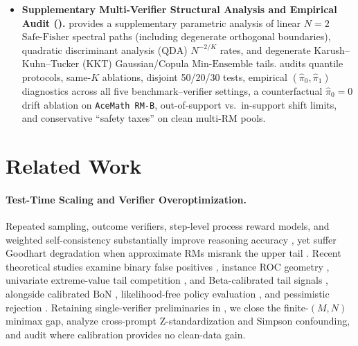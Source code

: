 \documentclass[10pt]{article}
\theoremstyle{plain}
\theoremstyle{definition}
\theoremstyle{remark}
\begin{document}
\begin{itemize}[leftmargin=1.4em,itemsep=1pt,topsep=1pt]
    \item \textbf{Supplementary Multi-Verifier Structural Analysis and Empirical Audit ().}  provides a supplementary parametric analysis of linear $N=2$ $\mathrm{Safe\text{-}Fisher}$ spectral paths (including degenerate orthogonal boundaries), quadratic discriminant analysis ($\mathrm{QDA}$) $N^{-2/K}$ rates, and degenerate Karush--Kuhn--Tucker ($\mathrm{KKT}$) Gaussian/Copula $\mathrm{Min\text{-}Ensemble}$ tails.  audits quantile protocols, same-$K$ ablations, disjoint 50/20/30 tests, empirical $(\hat{\pi}_0, \hat{\pi}_1)$ diagnostics across all five benchmark--verifier settings, a counterfactual $\hat{\pi}_0 = 0$ drift ablation on \texttt{AceMath RM-B}, out-of-support vs.\ in-support shift limits, and conservative ``safety taxes'' on clean multi-RM pools.
\end{itemize}

\section{Related Work}
\label{sec:related}

\paragraph{Test-Time Scaling and Verifier Overoptimization.}
Repeated sampling, outcome verifiers, step-level process reward models, and weighted self-consistency substantially improve reasoning accuracy \citep{cobbe2021training,wang2023selfconsistency,lightman2024lets,brown2024large,snell2024scaling,wu2024inference}, yet suffer Goodhart degradation when approximate RMs misrank the upper tail \citep{gao2023scaling,beirami2025theoretical}. Recent theoretical studies examine binary false positives \citep{stroebl2024inference}, instance ROC geometry \citep{dorner2025roc}, univariate extreme-value tail competition \citep{yano2026tail}, and Beta-calibrated tail signals \citep{gui2026whether}, alongside calibrated $\mathrm{BoN}$ \citep{tang2025carbon}, likelihood-free policy evaluation \citep{schweisthal2026efficient}, and pessimistic rejection \citep{huang2025best}. Retaining single-verifier preliminaries in , we close the finite-$(M,N)$ minimax gap, analyze cross-prompt Z-standardization and Simpson confounding, and audit where calibration provides no clean-data gain.
\end{document}
